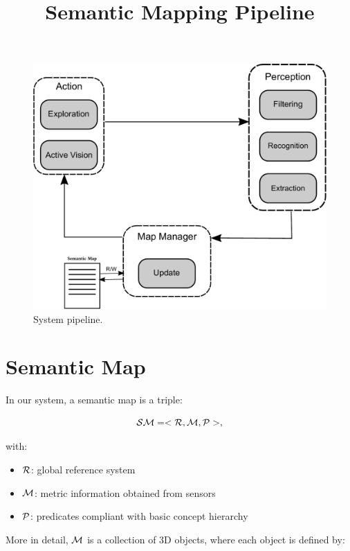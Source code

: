 \documentclass{article}
\title{\LARGE \bf Semantic Mapping Pipeline}
\begin{document}
	
	\maketitle	
	
	\begin{figure}[htbp]
		\centering
		\includegraphics[width=\linewidth]{pics/drawing-crop.pdf}
		\caption{System pipeline.}
		\label{fig:pipeline}
	\end{figure}
	
	\section{Semantic Map}
	
	In our system, a semantic map is a triple:
	
	\begin{equation}
		\mathcal{SM} = < \mathcal{R}, \mathcal{M}, \mathcal{P} >,
	\end{equation}
	
	\noindent
	with:
	
	\begin{itemize}
		\item $\mathcal{R}$: global reference system
		\item $\mathcal{M}$: metric information obtained from sensors
		\item $\mathcal{P}$: predicates compliant with basic concept hierarchy
	\end{itemize}
	
	More in detail, $\mathcal{M}$ is a collection of 3D objects, where each object is defined by:
	
\end{document}
